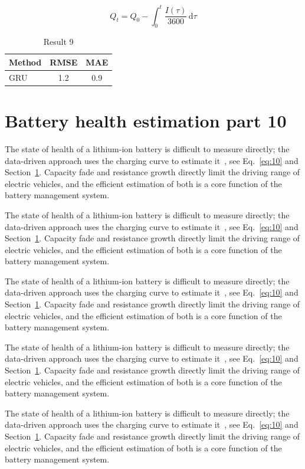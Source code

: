 \documentclass[11pt]{article}
\begin{document}
\begin{equation}\label{eq:9}
  Q_t = Q_0 - \int_0^t \frac{I(\tau)}{3600}\,\mathrm{d}\tau
\end{equation}
\begin{table}[h]\centering\begin{tabular}{lcc}\toprule Method & RMSE & MAE\\\midrule GRU & 1.2 & 0.9\\\bottomrule\end{tabular}\caption{Result 9}\end{table}

\section{Battery health estimation part 10}\label{sec:10}
The state of health of a lithium-ion battery is difficult to measure directly; the data-driven approach uses the charging curve to estimate it~\cite{a2020}, see Eq.~\eqref{eq:10} and Section~\ref{sec:10}. Capacity fade and resistance growth directly limit the driving range of electric vehicles, and the efficient estimation of both is a core function of the battery management system.

The state of health of a lithium-ion battery is difficult to measure directly; the data-driven approach uses the charging curve to estimate it~\cite{a2020}, see Eq.~\eqref{eq:10} and Section~\ref{sec:10}. Capacity fade and resistance growth directly limit the driving range of electric vehicles, and the efficient estimation of both is a core function of the battery management system.

The state of health of a lithium-ion battery is difficult to measure directly; the data-driven approach uses the charging curve to estimate it~\cite{a2020}, see Eq.~\eqref{eq:10} and Section~\ref{sec:10}. Capacity fade and resistance growth directly limit the driving range of electric vehicles, and the efficient estimation of both is a core function of the battery management system.

The state of health of a lithium-ion battery is difficult to measure directly; the data-driven approach uses the charging curve to estimate it~\cite{a2020}, see Eq.~\eqref{eq:10} and Section~\ref{sec:10}. Capacity fade and resistance growth directly limit the driving range of electric vehicles, and the efficient estimation of both is a core function of the battery management system.

The state of health of a lithium-ion battery is difficult to measure directly; the data-driven approach uses the charging curve to estimate it~\cite{a2020}, see Eq.~\eqref{eq:10} and Section~\ref{sec:10}. Capacity fade and resistance growth directly limit the driving range of electric vehicles, and the efficient estimation of both is a core function of the battery management system.
\end{document}

